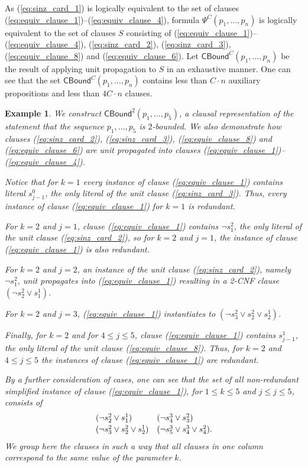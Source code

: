 \documentclass{article} \usepackage[utf8]{inputenc}
\newcommand*{\csf}{\ensuremath{{s}}}
\newcommand*{\ssf}{\ensuremath{{s}}}
\newcommand*{\Eq}{\ensuremath{\Psi}}
\newcommand*{\CBound}{\ensuremath{\mathsf{CBound}}}
\newtheorem{example}[theorem]{Example}
\begin{document}
As (\ref{eq:sinz_card_1}) is logically equivalent to the set of clauses
(\ref{eq:equiv_clause_1})--(\ref{eq:equiv_clause_4}), formula 
$\Eq^{C}(p_1,\dots,p_n)$  is logically equivalent to 
the set of clauses $S$ consisting of 
(\ref{eq:equiv_clause_1})--(\ref{eq:equiv_clause_4}), 
(\ref{eq:sinz_card_2}), 
(\ref{eq:sinz_card_3}), 
(\ref{eq:equiv_clause_8})
and
(\ref{eq:equiv_clause_6}). 
Let $\CBound^C(p_1,\dots,p_n)$ be the result of applying unit propagation to $S$ in an 
exhaustive manner.
One can see that
the set $\CBound^C(p_1,\dots,p_n)$ contains less than $C\cdot n$ auxiliary propositions
and less than $4C\cdot n$ clauses.

\begin{example}
We construct $\CBound^2(p_1,\dots,p_5)$,
a clausal representation of the statement that the sequence
$p_1,\dots, p_5$ is $2$-bounded.
We also demonstrate how clauses (\ref{eq:sinz_card_2}), (\ref{eq:sinz_card_3}),  
(\ref{eq:equiv_clause_8})
and 
(\ref{eq:equiv_clause_6})
are unit propagated into clauses (\ref{eq:equiv_clause_1})--(\ref{eq:equiv_clause_4}).


Notice that for $k=1$ every instance of clause (\ref{eq:equiv_clause_1}) contains 
literal $\csf^0_{j-1}$, the only literal of the unit clause (\ref{eq:sinz_card_3}).
Thus, every instance of clause (\ref{eq:equiv_clause_1}) for $k=1$ is redundant.

For $k=2$ and $j=1$, clause (\ref{eq:equiv_clause_1}) contains $\lnot \csf^2_1$, the
only literal of the unit clause (\ref{eq:sinz_card_2}), so for 
$k=2$ and $j=1$, the instance of clause (\ref{eq:equiv_clause_1})  is also redundant.

For $k=2$ and $j=2$,  an instance of
the unit clause (\ref{eq:sinz_card_2}), namely $\lnot\csf^2_1$, unit propagates into 
(\ref{eq:equiv_clause_1}) resulting in a 2-CNF clause 
$(\lnot \ssf^2_2 \lor \ssf^1_1)$.


For $k=2$ and $j=3$, (\ref{eq:equiv_clause_1}) instantiates to 
$ (\lnot \ssf^2_3 \lor \ssf^2_2 \lor \ssf^1_2)$.

Finally, for $k=2$  and 
for $4\leq j\leq 5$, clause (\ref{eq:equiv_clause_1}) contains $\csf^1_{j-1}$, 
the only literal of the unit clause  (\ref{eq:equiv_clause_8}). Thus, for 
$k=2$ and $4\leq j\leq 5$ the instances of clause (\ref{eq:equiv_clause_1}) are redundant.

By a further consideration of cases, one can see that the set of all
non-redundant simplified instance of clause (\ref{eq:equiv_clause_1}), for
$1\leq k \leq 5$ and $j\leq j\leq 5$, consists of 
\begin{equation}\label{eq:ex1.1}
\begin{array}{l@{\quad}l}
(\lnot \ssf^2_2 \lor \ssf^1_1)                &  (\lnot \ssf^3_4 \lor \ssf^2_3)      \\[2pt]
(\lnot \ssf^2_3 \lor \ssf^2_2 \lor \ssf^1_2)  &  (\lnot \ssf^3_5 \lor \ssf^3_4 \lor \ssf^2_4).
\end{array}
\end{equation}
We group here the clauses in such a way that all clauses in one column correspond to the same
value of the parameter $k$.


\end{example}
\end{document}
